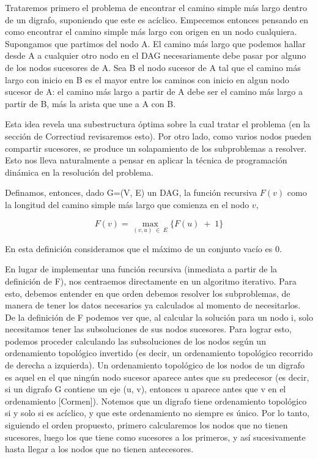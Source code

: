 Trataremos primero el problema de encontrar el camino simple m\'as largo dentro de un digrafo, suponiendo que este es ac\'iclico. 
Empecemos entonces pensando en como encontrar el camino simple m\'as largo con origen en un nodo cualquiera.
Supongamos que partimos del nodo A. 
El camino m\'as largo que podemos hallar desde A a cualquier otro nodo en el DAG necesariamente
debe pasar por alguno de los nodos sucesores de A. Sea B el nodo sucesor de A tal que el camino m\'as largo con inicio en B es el mayor entre los caminos con inicio en algun nodo sucesor de A:
el camino m\'as largo a partir de A debe ser el camino m\'as largo a partir de B, m\'as la arista que une a A con B.

Esta idea revela una subestructura \'optima sobre la cual tratar el problema (en la secci\'on de Correctiud revisaremos esto). Por otro lado, como varios nodos pueden compartir sucesores, se produce un solapamiento de los subproblemas a resolver.  
Esto nos lleva naturalmente a pensar en aplicar la t\'ecnica de programaci\'on din\'amica en la resoluci\'on del problema.

Definamos, entonces, dado G=(V, E) un DAG, la funci\'on recursiva $F(v)$ como la longitud del camino simple más largo que comienza en el nodo $v$, 

$$F(v)= \max_{(v, u)\;\in\;E} \{F(u)\; + \; 1\}$$

En esta definici\'on consideramos que el m\'aximo de un conjunto vac\'io es 0.

En lugar de implementar una funci\'on recursiva (inmediata a partir de la definici\'on de F), nos centraemos directamente en un
algoritmo iterativo. 
Para esto, debemos entender en que orden debemos resolver los subproblemas, de manera de tener los datos necesarios ya calculados al momento de necesitarlos. 
De la definici\'on de F podemos ver que, al calcular la soluci\'on para un nodo i, solo necesitamos tener las subsoluciones de sus nodos sucesores. 
Para lograr esto, podemos proceder calculando las subsoluciones de los nodos seg\'un un ordenamiento topol\'ogico invertido (es decir, un ordenamiento topol\'ogico recorrido de derecha a izquierda).
Un ordenamiento topol\'ogico de los nodos de un digrafo es aquel en el que ning\'un nodo sucesor aparece antes que su predecesor (es decir, si un digrafo G contiene un eje (u, v), entonces u aparece antes que v en el ordenamiento [Cormen]). Notemos que un digrafo tiene ordenamiento topol\'ogico si y solo si es ac\'iclico, y que este ordenamiento no siempre es único. Por lo tanto, siguiendo el orden propuesto, primero calcularemos los nodos que no tienen sucesores, luego los que tiene como sucesores a los primeros, y as\'i sucesivamente hasta llegar a los nodos que no tienen antecesores.

